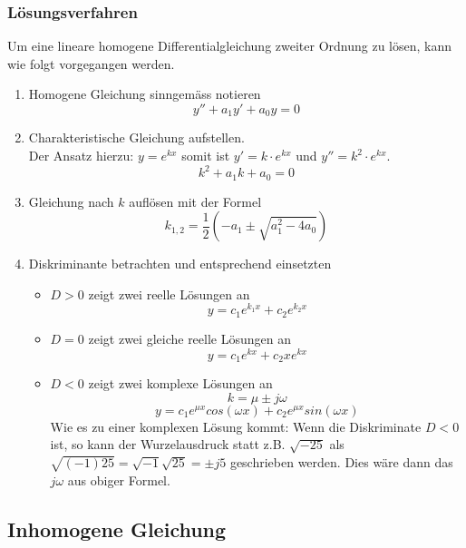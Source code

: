 \subsubsection{Lösungsverfahren}
Um eine lineare homogene Differentialgleichung zweiter Ordnung zu 
lösen, kann wie folgt vorgegangen werden.
\begin{enumerate}
  \item Homogene Gleichung sinngemäss notieren
	\[ y'' + a_1y' + a_0y = 0 \]
  \item Charakteristische Gleichung aufstellen.\\
	Der Ansatz hierzu: $y=e^{kx}$ somit ist $y'=k\cdot e^{kx}$
	und $y''=k^2 \cdot e^{kx}$.
	\[ k^2 + a_1k + a_0 = 0 \]
  \item Gleichung nach $k$ auflösen mit der Formel
	\[ k_{1,2} = \frac{1}{2}\left( -a_1 \pm \sqrt{a_1^2 - 4a_0} \right)  \]
  \item Diskriminante betrachten und entsprechend einsetzten
	\begin{itemize}
	  \item $D > 0$ zeigt zwei reelle Lösungen an\\
		\[ y=c_1e^{k_1x} + c_2e^{k_2x} \]
          \item $D = 0$ zeigt zwei gleiche reelle Lösungen an\\
		\[ y=c_1e^{kx} + c_2xe^{kx} \]
          \item $D < 0$ zeigt zwei komplexe Lösungen an\\
		\[ k=\mu \pm j \omega \]
		\[ y=c_1e^{\mu x} cos(\omega x) + c_2e^{\mu x} sin(\omega x) \]
		Wie es zu einer komplexen Lösung kommt: 
		Wenn die Diskriminate $D < 0$ ist, so kann der Wurzelausdruck
		statt z.B. $\sqrt{-25}$ als 
		$\sqrt{(-1)25}=\sqrt{-1}\sqrt{25}=\pm j5$ geschrieben werden.
		Dies wäre dann das $j\omega$ aus obiger Formel.
	\end{itemize}
\end{enumerate}

\subsection{Inhomogene Gleichung}

